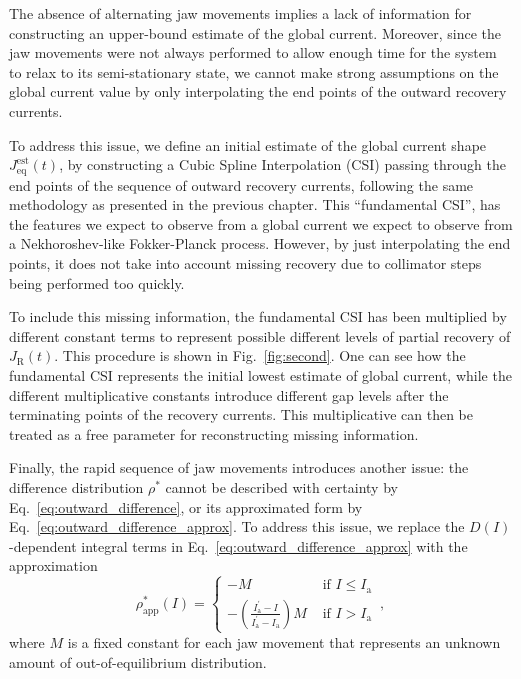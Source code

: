 The absence of alternating jaw movements implies a lack of information for constructing an upper-bound estimate of the global current. Moreover, since the jaw movements were not always performed to allow enough time for the system to relax to its semi-stationary state, we cannot make strong assumptions on the global current value by only interpolating the end points of the outward recovery currents. 

To address this issue, we define an initial estimate of the global current shape $J_\text{eq}^{\text{est}}(t)$, by constructing a Cubic Spline Interpolation (CSI) passing through the end points of the sequence of outward recovery currents, following the same methodology as presented in the previous chapter. This ``fundamental CSI'', has the features we expect to observe from a global current we expect to observe from a Nekhoroshev-like Fokker-Planck process. However, by just interpolating the end points, it does not take into account missing recovery due to collimator steps being performed too quickly.

To include this missing information, the fundamental CSI has been multiplied by different constant terms to represent possible different levels of partial recovery of $J_\mathrm{R}(t)$. This procedure is shown in Fig.~\ref{fig:second}. One can see how the fundamental CSI represents the initial lowest estimate of global current, while the different multiplicative constants introduce different gap levels after the terminating points of the recovery currents. This multiplicative can then be treated as a free parameter for reconstructing missing information.

Finally, the rapid sequence of jaw movements introduces another issue: the difference distribution $\rho^\ast$ cannot be described with certainty by Eq.~\eqref{eq:outward_difference}, or its approximated form by Eq.~\eqref{eq:outward_difference_approx}. To address this issue, we replace the $D(I)$-dependent integral terms in Eq.~\eqref{eq:outward_difference_approx} with the approximation
\begin{equation}
    \rho_{\mathrm{app}}^{\ast}(I)= \begin{cases} -M & \text { if } I\leq I_{\mathrm{a}}\\ -\left(\frac{I_{\mathrm{a}}^{\prime }-I}{I_{\mathrm{a}}^{ \prime}-I_{\mathrm{a}}}\right) M & \text { if } I>I_{\mathrm{a}}  \end{cases} \, ,
    \label{eq:approximated_distribution_beam}
\end{equation}
where $M$ is a fixed constant for each jaw movement that represents an unknown amount of out-of-equilibrium distribution.


